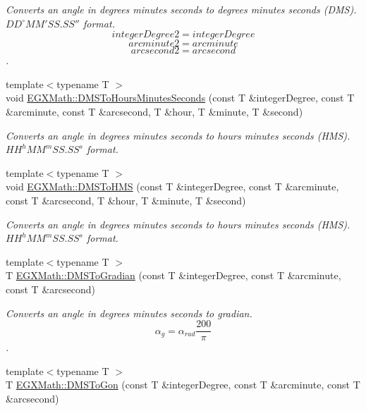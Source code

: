 \begin{DoxyCompactItemize}
\begin{DoxyCompactList}\small\item\em Converts an angle in degrees minutes seconds to degrees minutes seconds (D\+MS). ${DD}^{\circ}{MM}'{SS.SS}''$ format. \[integerDegree2 = integerDegree \] \[arcminute2 = arcminute\] \[arcsecond2 = arcsecond\]. \end{DoxyCompactList}\item 
{\footnotesize template$<$typename T $>$ }\\void \mbox{\hyperlink{group___e_g_x_math-_angle_conversions-_d_m_s_ga62f95d8bf79b8788ef6d1003f8d6a65f}{E\+G\+X\+Math\+::\+D\+M\+S\+To\+Hours\+Minutes\+Seconds}} (const T \&integer\+Degree, const T \&arcminute, const T \&arcsecond, T \&hour, T \&minute, T \&second)
\begin{DoxyCompactList}\small\item\em Converts an angle in degrees minutes seconds to hours minutes seconds (H\+MS). ${HH}^h{MM}^m{SS.SS}^s$ format. \end{DoxyCompactList}\item 
{\footnotesize template$<$typename T $>$ }\\void \mbox{\hyperlink{group___e_g_x_math-_angle_conversions-_d_m_s_ga570e90c6555753cccfcaa55f0e6374ac}{E\+G\+X\+Math\+::\+D\+M\+S\+To\+H\+MS}} (const T \&integer\+Degree, const T \&arcminute, const T \&arcsecond, T \&hour, T \&minute, T \&second)
\begin{DoxyCompactList}\small\item\em Converts an angle in degrees minutes seconds to hours minutes seconds (H\+MS). ${HH}^h{MM}^m{SS.SS}^s$ format. \end{DoxyCompactList}\item 
{\footnotesize template$<$typename T $>$ }\\T \mbox{\hyperlink{group___e_g_x_math-_angle_conversions-_d_m_s_ga2abca0654499b46df6ab9592f95b9ef1}{E\+G\+X\+Math\+::\+D\+M\+S\+To\+Gradian}} (const T \&integer\+Degree, const T \&arcminute, const T \&arcsecond)
\begin{DoxyCompactList}\small\item\em Converts an angle in degrees minutes seconds to gradian. \[\alpha_{g}=\alpha_{rad}\frac{200}{\pi}\]. \end{DoxyCompactList}\item 
{\footnotesize template$<$typename T $>$ }\\T \mbox{\hyperlink{group___e_g_x_math-_angle_conversions-_d_m_s_ga47fe1b9127ec6b73ee759eef038a8eb6}{E\+G\+X\+Math\+::\+D\+M\+S\+To\+Gon}} (const T \&integer\+Degree, const T \&arcminute, const T \&arcsecond)

\end{DoxyCompactItemize}
